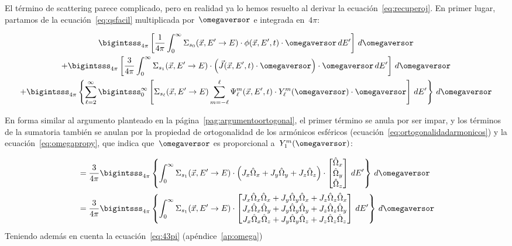 \medskip


El término de scattering parece complicado, pero en realidad ya lo hemos resuelto al derivar la ecuación~\eqref{eq:recuperoj}. En primer lugar, partamos de la ecuación~\eqref{eq:qsfacil} multiplicada por~$\omegaversor$ e integrada en~$4\pi$:

\begin{multline*}
\bigintsss_{4\pi} \left[ \frac{1}{4\pi} \int_{0}^{\infty} \Sigma_{s_0}(\vec{x}, E^{\prime} \rightarrow E) \cdot \phi(\vec{x}, E^{\prime}, t) \cdot \omegaversor  \, dE^\prime \right] \, d\omegaversor \\
+ \bigintsss_{4\pi} \left[ \frac{3}{4\pi} \int_{0}^{\infty} \Sigma_{s_1}(\vec{x}, E^{\prime} \rightarrow E) \cdot \left(\vec{J}(\vec{x},E^{\prime},t) \cdot \omegaversor\right) \cdot \omegaversor\, dE^\prime \right] \, d\omegaversor  \\
+ \bigintsss_{4\pi}  \left\{ \sum_{\ell=2}^\infty \bigintsss_{0}^{\infty}   \left[ \Sigma_{s_\ell}(\vec{x}, E^{\prime} \rightarrow E) 
\sum_{m=-\ell}^{\ell} \Psi_\ell^m (\vec{x}, E^{\prime}, t) \cdot Y_\ell^{m}(\omegaversor) \cdot \omegaversor \right] \, dE^{\prime} \right\} \, d\omegaversor
\end{multline*}

En forma similar al argumento planteado en la página~\ref{pag:argumentoortogonal}, el primer término se anula por ser impar, y los términos de la sumatoria también se anulan por la propiedad de ortogonalidad de los armónicos esféricos (ecuación~\eqref{eq:ortogonalidadarmonicos}) y la ecuación~\eqref{eq:omegapropy}, que indica que~$\omegaversor$ es proporcional a~$Y_1^m(\omegaversor)$:

\begin{align*}
&= \frac{3}{4\pi} \bigintsss_{4\pi} \left\{ \int_0^\infty \Sigma_{s_1}(\vec{x},E^\prime \rightarrow E) \cdot \left( J_x \hat{\Omega}_x + J_y \hat{\Omega}_y + J_z \hat{\Omega}_z \right) \cdot
\begin{bmatrix}
 \hat{\Omega}_x \\ \hat{\Omega}_y \\ \hat{\Omega}_z
\end{bmatrix}
\, dE^\prime \right\}  \, d\omegaversor \\
&= \frac{3}{4\pi} \bigintsss_{4\pi}
\left\{ \int_0^\infty \Sigma_{s_1}(\vec{x},E^\prime \rightarrow E) \cdot
\begin{bmatrix}
 J_x \hat{\Omega}_x \hat{\Omega}_x +  J_y \hat{\Omega}_y \hat{\Omega}_x +  J_z \hat{\Omega}_z \hat{\Omega}_x \\
 J_x \hat{\Omega}_x \hat{\Omega}_y +  J_y \hat{\Omega}_y \hat{\Omega}_y +  J_z \hat{\Omega}_z \hat{\Omega}_y \\
 J_x \hat{\Omega}_x \hat{\Omega}_z +  J_y \hat{\Omega}_y \hat{\Omega}_z +  J_z \hat{\Omega}_z \hat{\Omega}_z
\end{bmatrix}
\, dE^\prime \right\}  \, d\omegaversor
\end{align*}
%
Teniendo además en cuenta la ecuación~\eqref{eq:43pi} (apéndice~\ref{ap:omega})

